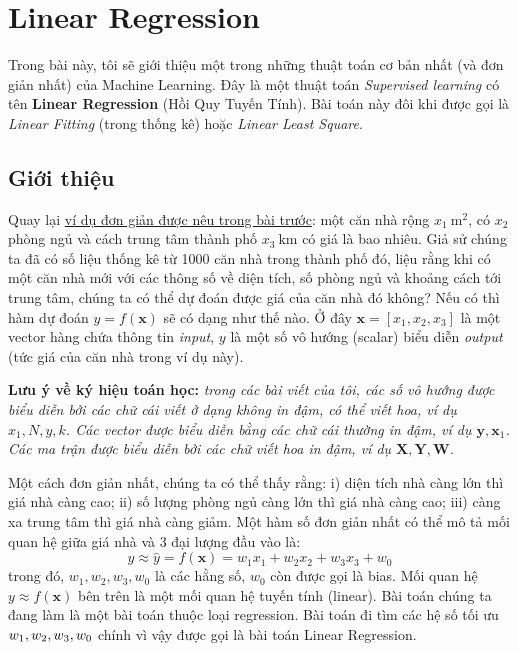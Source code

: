 \chapter{Linear Regression}

 
Trong bài này, tôi sẽ giới thiệu một trong những thuật toán cơ bản nhất (và đơn giản nhất) của Machine Learning. Đây là một thuật toán \textit{Supervised learning} có tên {\textbf{Linear Regression}} (Hồi Quy Tuyến Tính). Bài toán này đôi khi được gọi là \textit{Linear Fitting} (trong thống kê) hoặc \textit{Linear Least Square}. 

\section{Giới thiệu}
 
Quay lại \href{http://machinelearningcoban.com/2016/12/27/categories/#regression-hoi-quy}{ví dụ đơn giản được nêu trong bài trước}: một căn nhà rộng $x_1 ~ \text{m}^2$, có $x_2$ phòng ngủ và cách trung tâm thành phố $x_3~ \text{km}$ có giá là bao nhiêu. Giả sử chúng ta đã có số liệu thống kê từ 1000 căn nhà trong thành phố đó, liệu rằng khi có một căn nhà mới với các thông số về diện tích, số phòng ngủ và khoảng cách tới trung tâm, chúng ta có thể dự đoán được giá của căn nhà đó không? Nếu có thì hàm dự đoán $y = f(\mathbf{x}) $ sẽ có dạng như thế nào. Ở đây $\mathbf{x} = [x_1, x_2, x_3] $ là một vector hàng chứa thông tin \textit{input}, $y$ là một số vô hướng (scalar) biểu diễn \textit{output} (tức giá của căn nhà trong ví dụ này). 
 
\textbf{Lưu ý về ký hiệu toán học:} \textit{trong các bài viết của tôi, các số vô hướng được biểu diễn bởi các chữ cái viết ở dạng không in đậm, có thể viết hoa, ví dụ $x_1, N, y, k$. Các vector được biểu diễn bằng các chữ cái thường in đậm, ví dụ $\mathbf{y}, \mathbf{x}_1 $. Các ma trận được biểu diễn bởi các chữ viết hoa in đậm, ví dụ $\mathbf{X, Y, W} $.} 
 
Một cách đơn giản nhất, chúng ta có thể thấy rằng: i) diện tích nhà càng lớn thì giá nhà càng cao; ii) số lượng phòng ngủ càng lớn thì giá nhà càng cao; iii) càng xa trung tâm thì giá nhà càng giảm. Một hàm số đơn giản nhất có thể mô tả mối quan hệ giữa giá nhà và 3 đại lượng đầu vào là:  
\begin{equation}
\label{eqn:linearregression}
y \approx   \hat{y} = f(\mathbf{x}) =w_1 x_1 + w_2 x_2 + w_3 x_3 + w_0 
\end{equation}
trong đó, $w_1, w_2, w_3, w_0$ là các hằng số,  $w_0$ còn được gọi là bias. Mối quan hệ $y \approx f(\mathbf{x})$ bên trên là một mối quan hệ tuyến tính (linear). Bài toán chúng ta đang làm là một bài toán thuộc loại regression. Bài toán đi tìm các hệ số tối ưu $ \\{w_1, w_2, w_3, w_0 \\}$ chính vì vậy được gọi là bài toán Linear Regression.  
 
